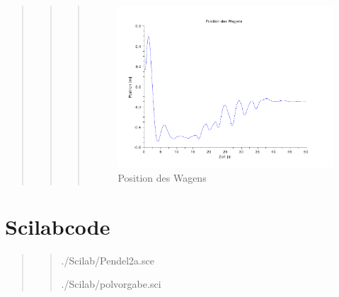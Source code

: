\begin{quote}
\begin{quote}
\begin{quote}
            
            \begin{figure}[H]
                \centering
                \includegraphics[scale=0.7, trim = 0cm 0cm 0cm 0cm, clip]{Bilder/pos_pos}
                \caption{Position des Wagens}
                \label{fig:pos_pos}
            \end{figure}
            
            
            
        \end{quote}%


        
        
    \end{quote}%


        
    
\end{quote} %


\section{Scilabcode}
\begin{quote}
\begin{quote}
    
        {./Scilab/Pendel2a.sce}
    
        {./Scilab/polvorgabe.sci}

\end{quote}

	
\end{quote} %

